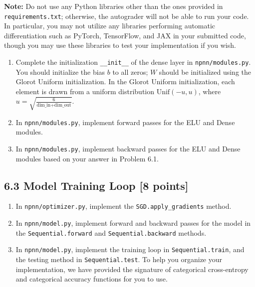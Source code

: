 \documentclass[a3paper,12pt]{extarticle} %
\begin{document}
\textbf{Note:} Do not use any Python libraries other than the ones provided in \texttt{requirements.txt}; otherwise, the autograder will not be able to run your code. In particular, you may not utilize any libraries performing automatic differentiation such as PyTorch, TensorFlow, and JAX in your submitted code, though you may use these libraries to test your implementation if you wish.

\begin{enumerate}
    \item 
    Complete the initialization \texttt{\_\_init\_\_} of the dense layer in \texttt{npnn/modules.py}. You should initialize the bias $b$ to all zeros; $W$ should be initialized using the Glorot Uniform initialization. In the Glorot Uniform initialization, each element is drawn from a uniform distribution $\text{Unif}(-u, u)$, where $u = \sqrt{\frac{6}{\text{dim\_in} + \text{dim\_out}}}$.
    \item 
    In \texttt{npnn/modules.py}, implement forward passes for the ELU and Dense modules.
    \item In \texttt{npnn/modules.py}, implement backward passes for the ELU and Dense modules based on your answer in Problem 6.1.
\end{enumerate}

\subsection*{6.3 Model Training Loop [8 points]}
\begin{enumerate}
    \item 
    In \texttt{npnn/optimizer.py}, implement the \texttt{SGD.apply\_gradients} method.
    \item
    In \texttt{npnn/model.py}, implement forward and backward passes for the model in the \texttt{Sequential.forward} and \texttt{Sequential.backward} methods.
    \item
    In \texttt{npnn/model.py}, implement the training loop in \texttt{Sequential.train}, and the testing method in \texttt{Sequential.test}. To help you organize your implementation, we have provided the signature of categorical cross-entropy and categorical accuracy functions for you to use.
\end{enumerate}
\end{document}
